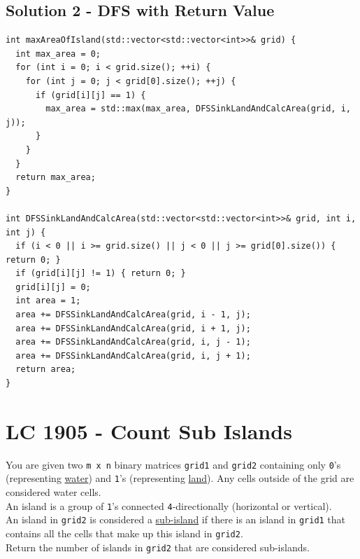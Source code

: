 \subsection*{Solution 2 - DFS with Return Value}
\begin{lstlisting}
int maxAreaOfIsland(std::vector<std::vector<int>>& grid) {
  int max_area = 0;
  for (int i = 0; i < grid.size(); ++i) {
    for (int j = 0; j < grid[0].size(); ++j) {
      if (grid[i][j] == 1) {
        max_area = std::max(max_area, DFSSinkLandAndCalcArea(grid, i, j));
      }
    }
  }
  return max_area;
}

int DFSSinkLandAndCalcArea(std::vector<std::vector<int>>& grid, int i, int j) {
  if (i < 0 || i >= grid.size() || j < 0 || j >= grid[0].size()) { return 0; }
  if (grid[i][j] != 1) { return 0; }
  grid[i][j] = 0;
  int area = 1;
  area += DFSSinkLandAndCalcArea(grid, i - 1, j);
  area += DFSSinkLandAndCalcArea(grid, i + 1, j);
  area += DFSSinkLandAndCalcArea(grid, i, j - 1);
  area += DFSSinkLandAndCalcArea(grid, i, j + 1);
  return area;
}
\end{lstlisting}

\section{LC 1905 - Count Sub Islands}
You are given two {\colorbox{CodeBackground}{\lstinline|m x n|}} binary matrices {\colorbox{CodeBackground}{\lstinline|grid1|}} and {\colorbox{CodeBackground}{\lstinline|grid2|}} containing only {\colorbox{CodeBackground}{\lstinline|0|}}'s (representing \ul{water}) and {\colorbox{CodeBackground}{\lstinline|1|}}'s (representing \ul{land}). Any cells outside of the grid are considered water cells.\\

An island is a group of {\colorbox{CodeBackground}{\lstinline|1|}}'s connected {\colorbox{CodeBackground}{\lstinline|4|}}-directionally (horizontal or vertical).\\

An island in {\colorbox{CodeBackground}{\lstinline|grid2|}} is considered a \ul{sub-island} if there is an island in {\colorbox{CodeBackground}{\lstinline|grid1|}} that contains all the cells that make up this island in {\colorbox{CodeBackground}{\lstinline|grid2|}}.\\

Return the number of islands in {\colorbox{CodeBackground}{\lstinline|grid2|}} that are considered sub-islands.

